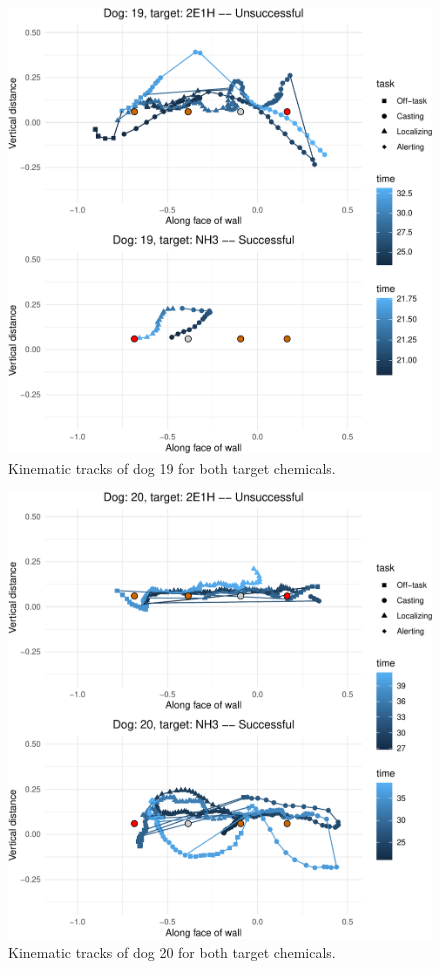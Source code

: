 \documentclass[
]{article}
\begin{document}
\begin{figure}
\centering
\includegraphics{supplementary-info_files/figure-latex/dog-19-1.pdf}
\caption{\label{fig:dog-19}Kinematic tracks of dog 19 for both target chemicals.}
\end{figure}

\begin{figure}
\centering
\includegraphics{supplementary-info_files/figure-latex/dog-20-1.pdf}
\caption{\label{fig:dog-20}Kinematic tracks of dog 20 for both target chemicals.}
\end{figure}
\end{document}
